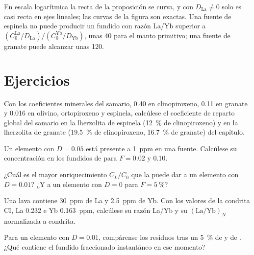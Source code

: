 En escala logarítmica la recta de la proposición se curva, y con
$D_{\mathrm{La}} \ne 0$ solo es casi recta en ejes lineales; las curvas
de la figura son exactas. Una fuente de espinela no puede producir
un fundido con razón La/Yb superior a $(C_0^{\mathrm{La}}/D_{\mathrm{La}})/(C_0^{\mathrm{Yb}}/D_{\mathrm{Yb}})$,
unas 40 para el manto primitivo; una fuente de granate puede alcanzar unas 120.

\section{Ejercicios}

\begin{exercise}[$\star$]\label{exo:b3:trace-element-modelling:1}
Con los coeficientes minerales del samario, 0.40 en clinopiroxeno, 0.11 en
granate y 0.016 en olivino, ortopiroxeno y espinela, calcúlese el
coeficiente de reparto global del samario en la lherzolita de espinela (\qty{12}{\percent}
de clinopiroxeno) y en la lherzolita de granate (\qty{19.5}{\percent} de clinopiroxeno,
\qty{16.7}{\percent} de granate) del capítulo.
\end{exercise}

\begin{exercise}[$\star$]\label{exo:b3:trace-element-modelling:2}
Un elemento con $D = 0.05$ está presente a \qty{1}{ppm} en una fuente. Calcúlese
su concentración en los fundidos de  para $F = 0.02$ y $0.10$.
\end{exercise}

\begin{exercise}[$\star$]\label{exo:b3:trace-element-modelling:3}
¿Cuál es el mayor enriquecimiento $C_L/C_0$ que la  puede dar a un
elemento con $D = 0.01$? ¿Y a un elemento con $D = 0$ para
$F = \qty{5}{\percent}$?
\end{exercise}

\begin{exercise}[$\star$]\label{exo:b3:trace-element-modelling:4}
Una lava contiene \qty{30}{ppm} de La y \qty{2.5}{ppm} de Yb. Con los valores de la
condrita CI, La 0.232 e Yb \qty{0.163}{ppm}, calcúlese su razón La/Yb y su
$(\mathrm{La}/\mathrm{Yb})_N$ normalizada a condrita.
\end{exercise}

\begin{exercise}[$\star\star$]\label{exo:b3:trace-element-modelling:5}
Para un elemento con $D = 0.01$, compárense los residuos tras un \qty{5}{\percent}
de  y de . ¿Qué contiene el fundido fraccionado
instantáneo en ese momento?
\end{exercise}

